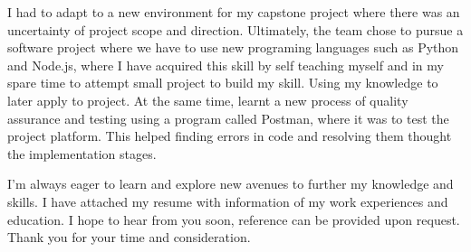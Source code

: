 \documentclass[11pt, a4paper]{awesome-cv} %
\begin{document}
\begin{cvletter}
\tab I had to adapt to a new environment for my capstone project where there was an uncertainty of project scope and direction. Ultimately, the team chose to pursue a software project where we have to use new programing languages such as Python and Node.js, where I have acquired this skill by self teaching myself and in my spare time to attempt small project to build my skill. Using my knowledge to later apply to project. At the same time, learnt a new process of quality assurance and testing using a program called Postman, where it was to test the project platform. This helped finding errors in code and resolving them thought the implementation stages.

\tab I’m always eager to learn and explore new avenues to further my knowledge and skills. I have attached my resume with information of my work experiences and education. I hope to hear from you soon, reference can be provided upon request. Thank you for your time and consideration. 









\end{cvletter}


\makeletterclosing %
\end{document}

